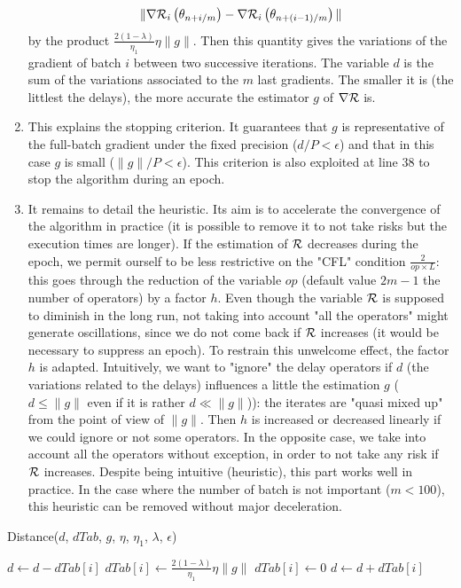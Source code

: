\begin{enumerate}
	\begin{equation*}
		\|\nabla \mathcal{R}_i\left(\theta_{n+i/m}\right)-\nabla \mathcal{R}_i\left(\theta_{n+(i-1)/m}\right)\|
	\end{equation*}
	by the product $\frac{2(1-\lambda)}{\eta_1}\eta\|g\|$. Then this quantity gives the variations of the gradient of batch $i$ between two successive iterations. The variable
        $d$ is the sum of the variations associated to the $m$ last gradients. The smaller it is (the littlest the delays), the more accurate the estimator $g$ of $\nabla \mathcal{R}$ is.
	\item This explains the stopping criterion. It guarantees that $g$ is representative of the full-batch gradient under the fixed precision ($d/P<\epsilon$) and that in this
          case $g$ is small ($\|g\|/P<\epsilon$). This criterion is also exploited at line 38 to stop the algorithm during an epoch.   
	\item It remains to detail the heuristic. Its aim is to accelerate the convergence of the algorithm in practice (it is possible to remove it to not take risks but the
          execution times are longer). If the estimation of $\mathcal{R}$ decreases during the epoch, we permit ourself to be less restrictive on the "CFL" condition $\frac{2}{op\times L}$:
          this goes through the reduction of the variable $op$ (default value $2m-1$ the number of operators) by a factor $h$. Even though the variable $\mathcal{R}$ is supposed to diminish
          in the long run, not taking into account "all the operators" might generate oscillations, since we do not come back if $\mathcal{R}$ increases (it would be necessary to suppress an epoch). To restrain this unwelcome effect, the factor $h$ is adapted. Intuitively, we want to "ignore" the delay operators if $d$ (the variations related to the delays) influences a little the estimation $g$ ($d\leq \|g\|$ even if it is rather $d\ll \|g\|$)): the iterates are "quasi mixed up" from the point of view of $\|g\|$. Then $h$ is increased or decreased linearly if we could ignore or not some operators. In the opposite case, we take into account all the operators without exception, in order to not take any risk if $\mathcal{R}$ increases. Despite being intuitive (heuristic), this part works well in practice. In the case where the number of batch is not important ($m<100$), this heuristic can be removed without major deceleration. 
\end{enumerate}    

\begin{algorithm}[h!]
	\caption{Distance($d$, $dTab$, $g$, $\eta$, $\eta_1$, $\lambda$, $\epsilon$)}
	\label{algo_dist}
	\begin{algorithmic}
		\STATE $d \leftarrow d-dTab[i]$
		\STATE $dTab[i] \leftarrow \frac{2(1-\lambda)}{\eta_1}\eta \|g\|$
		\ELSE
		\STATE $dTab[i] \leftarrow 0$
		\ENDIF
		\STATE $d \leftarrow d+dTab[i]$
	\end{algorithmic}
\end{algorithm}


